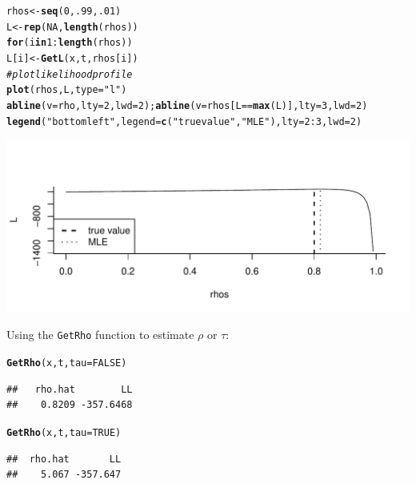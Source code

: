 \documentclass[10pt]{article}\usepackage[]{graphicx}\usepackage[]{color}
\makeatletter
\newcommand{\hlnum}[1]{\textcolor[rgb]{0.686,0.059,0.569}{#1}}%
\newcommand{\hlstr}[1]{\textcolor[rgb]{0.192,0.494,0.8}{#1}}%
\newcommand{\hlcom}[1]{\textcolor[rgb]{0.678,0.584,0.686}{\textit{#1}}}%
\newcommand{\hlopt}[1]{\textcolor[rgb]{0,0,0}{#1}}%
\newcommand{\hlstd}[1]{\textcolor[rgb]{0.345,0.345,0.345}{#1}}%
\newcommand{\hlkwa}[1]{\textcolor[rgb]{0.161,0.373,0.58}{\textbf{#1}}}%
\newcommand{\hlkwb}[1]{\textcolor[rgb]{0.69,0.353,0.396}{#1}}%
\newcommand{\hlkwc}[1]{\textcolor[rgb]{0.333,0.667,0.333}{#1}}%
\newcommand{\hlkwd}[1]{\textcolor[rgb]{0.737,0.353,0.396}{\textbf{#1}}}%
\newenvironment{kframe}{%
 \def\at@end@of@kframe{}%
 \ifinner\ifhmode%
  \def\at@end@of@kframe{\end{minipage}}%
  \begin{minipage}{\columnwidth}%
 \fi\fi%
 \def\FrameCommand##1{\hskip\@totalleftmargin \hskip-\fboxsep
 \colorbox{shadecolor}{##1}\hskip-\fboxsep
     \hskip-\linewidth \hskip-\@totalleftmargin \hskip\columnwidth}%
 \MakeFramed {\advance\hsize-\width
   \@totalleftmargin\z@ \linewidth\hsize
   \@setminipage}}%
 {\par\unskip\endMakeFramed%
 \at@end@of@kframe}
\newenvironment{knitrout}{}{} %
\makeatother
\begin{document}
\begin{knitrout}
\color{fgcolor}\begin{kframe}
\begin{alltt}
\hlstd{rhos} \hlkwb{<-} \hlkwd{seq}\hlstd{(}\hlnum{0}\hlstd{,}\hlnum{.99}\hlstd{,}\hlnum{.01}\hlstd{)}
\hlstd{L} \hlkwb{<-} \hlkwd{rep}\hlstd{(}\hlnum{NA}\hlstd{,} \hlkwd{length}\hlstd{(rhos))}
\hlkwa{for}\hlstd{(i} \hlkwa{in} \hlnum{1}\hlopt{:}\hlkwd{length}\hlstd{(rhos))}
  \hlstd{L[i]} \hlkwb{<-} \hlkwd{GetL}\hlstd{(x,t,rhos[i])}
\hlcom{# plot likelihood profile}
\hlkwd{plot}\hlstd{(rhos, L,} \hlkwc{type}\hlstd{=}\hlstr{"l"}\hlstd{)}
\hlkwd{abline}\hlstd{(}\hlkwc{v} \hlstd{= rho,} \hlkwc{lty}\hlstd{=}\hlnum{2}\hlstd{,} \hlkwc{lwd}\hlstd{=}\hlnum{2}\hlstd{);} \hlkwd{abline}\hlstd{(}\hlkwc{v} \hlstd{= rhos[L} \hlopt{==} \hlkwd{max}\hlstd{(L)],} \hlkwc{lty}\hlstd{=}\hlnum{3}\hlstd{,} \hlkwc{lwd}\hlstd{=}\hlnum{2}\hlstd{)}
\hlkwd{legend}\hlstd{(}\hlstr{"bottomleft"}\hlstd{,} \hlkwc{legend}\hlstd{=}\hlkwd{c}\hlstd{(}\hlstr{"true value"}\hlstd{,}\hlstr{"MLE"}\hlstd{),} \hlkwc{lty}\hlstd{=}\hlnum{2}\hlopt{:}\hlnum{3}\hlstd{,} \hlkwc{lwd}\hlstd{=}\hlnum{2}\hlstd{)}
\end{alltt}
\end{kframe}
\includegraphics[width=\textwidth]{figure/GetRhoDemo2} 

\end{knitrout}


Using the \texttt{GetRho} function to estimate $\rho$ or $\tau$:
\begin{knitrout}
\color{fgcolor}\begin{kframe}
\begin{alltt}
\hlkwd{GetRho}\hlstd{(x, t,} \hlkwc{tau} \hlstd{=} \hlnum{FALSE}\hlstd{)}
\end{alltt}
\begin{verbatim}
##   rho.hat        LL 
##    0.8209 -357.6468
\end{verbatim}
\begin{alltt}
\hlkwd{GetRho}\hlstd{(x, t,} \hlkwc{tau} \hlstd{=} \hlnum{TRUE}\hlstd{)}
\end{alltt}
\begin{verbatim}
##  rho.hat       LL 
##    5.067 -357.647
\end{verbatim}
\end{kframe}
\end{knitrout}
\end{document}
